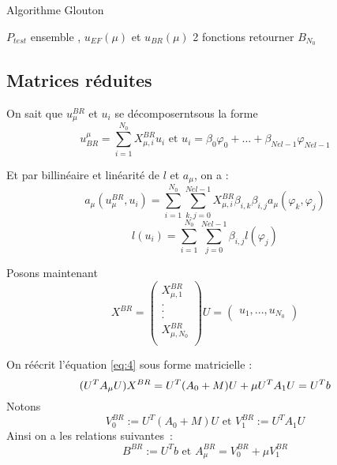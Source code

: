 \documentclass[12pt]{article}
\begin{document}
\begin{algorithm}
\caption{Algorithme Glouton}
\begin{algorithmic}
\REQUIRE $P_{test}$ ensemble , $u_{EF}(\mu)$ et $u_{BR}(\mu)$ 2 fonctions
\ENDFOR
\ENSURE retourner $B_{N_0}$ \\
\end{algorithmic}
\end{algorithm}







\subsection{ Matrices réduites}

\noindent On sait que $u^{BR}_{\mu}$ et $u_i$  se décomposerntsous la forme 
$$ 
u_{BR}^{\mu} = \sum_{i = 1}^{N_0} X^{BR}_{\mu, i}u_i 
\text{ et } 
u_i = \beta_0 \varphi_0 + ... + \beta_{Nel-1} \varphi_{Nel-1} 
$$

Et par billinéaire et linéarité de $l$ et $a_{\mu}$, on a :
$$
a_{\mu}(u^{BR}_{\mu}, u_i) = \sum_{i= 1}^{N_0}
\sum_{k, j= 0}^{Nel-1} X^{BR}_{\mu, i} 
\beta_{i, k} \beta_{i, j} a_\mu(\varphi_{k}, \varphi_{j})
$$
$$
l(u_i) = \sum_{i= 1}^{N_0}\sum_{j= 0}^{Nel-1} \beta_{i, j} l(\varphi_{j})
$$

\noindent Posons maintenant
$$
X^{BR} = \begin{pmatrix}
X^{BR}_{\mu,1} \\

. \\

. \\

. \\
X^{BR}_{\mu,N_0} \\
\end{pmatrix} 
U = \begin{pmatrix}
u_1, ..., u_{N_0}
\end{pmatrix} 
$$

\noindent On réécrit l'équation \eqref{eq:4} sous forme matricielle :
$$
(U^{T}A_{\mu}U)X^{BR} = 
U^{T}(A_0 + M)U + \mu U^{T}A_1U = U^{T}b \\
$$
Notons 
$$
V_{0}^{BR} := U^{T}(A_0 + M)U \text{   et   }  V_{1}^{BR} := U^{T}A_1U
$$
Ainsi on a les relations suivantes :
$$
B^{BR} := U^{T}b \text{    et    } A^{BR}_{\mu} = V_{0}^{BR} + \mu V_{1}^{BR}
$$
\end{document}
